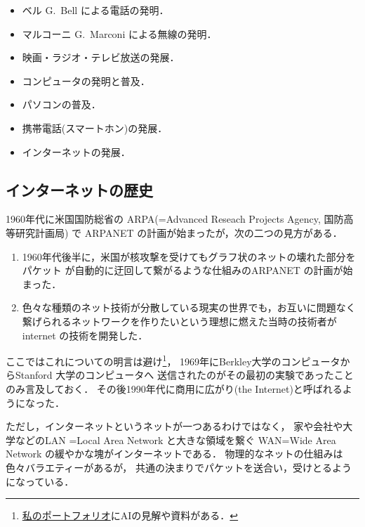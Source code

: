\begin{itemize}
   \item 
      ベル G.~Bell による電話の発明．
      
   \item 
      マルコーニ G.~Marconi による無線の発明．
   
   \item 
      映画・ラジオ・テレビ放送の発展．
   
   \item 
      コンピュータの発明と普及．
 
    \item
      パソコンの普及．
        
   \item
      携帯電話(スマートホン)の発展．

   \item
      インターネットの発展．
\end{itemize}

\subsection{インターネットの歴史}

1960年代に米国国防総省の
ARPA(=Advanced Reseach Projects Agency, 国防高等研究計画局) で
ARPANET の計画が始まったが，次の二つの見方がある．

\begin{enumerate}
  \item 1960年代後半に，米国が核攻撃を受けてもグラフ状のネットの壊れた部分をパケット が自動的に迂回して繋がるような仕組みのARPANET の計画が始まった．
  \item 色々な種類のネット技術が分散している現実の世界でも，お互いに問題なく繋げられるネットワークを作りたいという理想に燃えた当時の技術者が internet の技術を開発した．
\end{enumerate}
ここではこれについての明言は避け\footnote{ \href{https://snow00two.github.io/mySite/}{私のポートフォリオ}にAIの見解や資料がある．}，
1969年にBerkley大学のコンピュータからStanford  大学のコンピュータへ
送信されたのがその最初の実験であったことのみ言及しておく．
その後1990年代に商用に広がり(the Internet)と呼ばれるようになった．

ただし，インターネットというネットが一つあるわけではなく，
家や会社や大学などのLAN =Local Area Network と大きな領域を繋ぐ
WAN=Wide Area Network の緩やかな塊がインターネットである．
物理的なネットの仕組みは色々バラエティーがあるが，
共通の決まりでパケットを送合い，受けとるようになっている．

